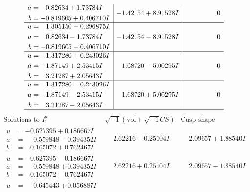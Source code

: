 \documentclass[1p]{elsarticle_modified}
\theoremstyle{definition}
\newcommand{\I}{\sqrt{-1}}
\begin{document}
$$\begin{array}{c|c|c}
\begin{aligned}
a &= \phantom{-}0.82634 + 1.73784 I \\
b &= -0.819605 + 0.406710 I\end{aligned}
 & -1.42154 + 8.91528 I & \phantom{-0.000000 } 0 \\ \hline\begin{aligned}
u &= \phantom{-}1.305150 - 0.296875 I \\
a &= \phantom{-}0.82634 - 1.73784 I \\
b &= -0.819605 - 0.406710 I\end{aligned}
 & -1.42154 - 8.91528 I & \phantom{-0.000000 } 0 \\ \hline\begin{aligned}
u &= -1.317280 + 0.243026 I \\
a &= -1.87149 + 2.53415 I \\
b &= \phantom{-}3.21287 + 2.05643 I\end{aligned}
 & \phantom{-}1.68720 - 5.00295 I & \phantom{-0.000000 } 0 \\ \hline\begin{aligned}
u &= -1.317280 - 0.243026 I \\
a &= -1.87149 - 2.53415 I \\
b &= \phantom{-}3.21287 - 2.05643 I\end{aligned}
 & \phantom{-}1.68720 + 5.00295 I & \phantom{-0.000000 } 0\\
 \hline 
 \end{array}$$\newpage$$\begin{array}{c|c|c}  
\text{Solutions to }I^u_{1}& \I (\text{vol} + \sqrt{-1}CS) & \text{Cusp shape}\\
 \hline 
\begin{aligned}
u &= -0.627395 + 0.186667 I \\
a &= \phantom{-}0.559848 - 0.394352 I \\
b &= -0.165072 + 0.762467 I\end{aligned}
 & \phantom{-}2.62216 - 0.25104 I & \phantom{-}2.09657 + 1.88540 I \\ \hline\begin{aligned}
u &= -0.627395 - 0.186667 I \\
a &= \phantom{-}0.559848 + 0.394352 I \\
b &= -0.165072 - 0.762467 I\end{aligned}
 & \phantom{-}2.62216 + 0.25104 I & \phantom{-}2.09657 - 1.88540 I \\ \hline\begin{aligned}
u &= \phantom{-}0.645443 + 0.056887 I \\

\end{aligned}
\end{array}$$
\end{document}
